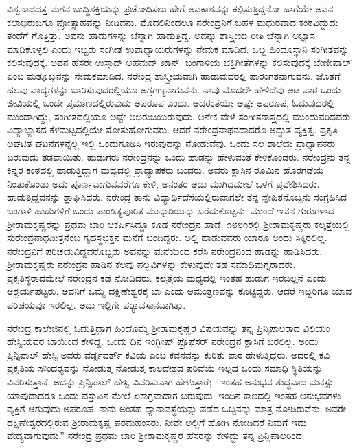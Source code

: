 ವಿಶ್ವನಾಥದತ್ತ ಮಗನ ಬುದ್ಧಿಶಕ್ತಿಯನ್ನು ಪ್ರಚೋದಿಸಲು ಹೇಗೆ ಅವಕಾಶವನ್ನು ಕಲ್ಪಿಸುತ್ತಿದ್ದನೋ ಹಾಗೆಯೇ ಅವನ ಕಲಾಭಿರುಚಿಗೂ ಪ್ರೋತ್ಸಾಹವನ್ನು ನೀಡಿದನು. ಮೊದಲಿನಿಂದಲೂ ನರೇಂದ್ರನಿಗೆ ಬಹಳ ಮಧುರವಾದ ಕಂಠವಿದ್ದುದು ತಂದೆಗೆ ಗೊತ್ತಿತ್ತು. ಅವನು ಹಾಡುಗಳನ್ನು ಚೆನ್ನಾಗಿ ಹಾಡುತ್ತಿದ್ದ. ಅದನ್ನು ಶಾಸ್ತ್ರೀಯ ರೀತಿ ಚೆನ್ನಾಗಿ ಅಭ್ಯಾಸ ಮಾಡಿಕೊಳ್ಳಲಿ ಎಂದು ಇಬ್ಬರು ಸಂಗೀತ ಉಪಾಧ್ಯಾಯರುಗಳನ್ನು ನೇಮಕ ಮಾಡಿದ. ಒಬ್ಬ ಹಿಂದೂಸ್ಥಾನಿ ಸಂಗೀತವನ್ನು ಕಲಿಸುವುದಕ್ಕೆ. ಅವನ ಹೆಸರೇ ಉಸ್ತಾದ್ ಅಹಮದ್ ಖಾನ್. ಬಂಗಾಳಿಯ ಭಕ್ತಿಗೀತೆಗಳನ್ನು ಕಲಿಸುವುದಕ್ಕೆ ಬೇಣೀಪಾಲ್ ಎಂಬ ಮತ್ತೊಬ್ಬನನ್ನು ನೇಮಕಮಾಡಿದ. ನರೇಂದ್ರ ಶಾಸ್ತ್ರೀಯವಾಗಿ ಹಾಡುವುದರಲ್ಲಿ ಪಾರಂಗತನಾಗುವನು. ಜೊತೆಗೆ ಹಲವು ವಾದ್ಯಗಳನ್ನು ಬಾರಿಸುವುದರಲ್ಲಿಯೂ ಅಗ್ರಗಣ್ಯನಾಗುವನು. ನಾವು ಮೊದಲೇ ಹೇಳಿದೆವು ಆಟ ಪಾಠ ಒಂದು ಜೀವಿಯಲ್ಲಿ ಒಂದೇ ಪ್ರಮಾಣದಲ್ಲಿರುವುದು ಅಪರೂಪ ಎಂದು. ಅದರಂತೆಯೇ ಅಷ್ಟೇ ಅಪರೂಪ, ಓದುವುದರಲ್ಲಿ ಮುಂದಾಗಿದ್ದು, ಸಂಗೀತದಲ್ಲಿಯೂ ಅಷ್ಟೇ ಅಭಿರುಚಿಯಿರುವುದು. ಅನೇಕ ವೇಳೆ ಸಂಗೀತಶಾಸ್ತ್ರದಲ್ಲಿ ಮುಂದುವರಿದವರು ವಿದ್ಯಾಭ್ಯಾಸದ ಕೆಳಮಟ್ಟದಲ್ಲಿಯೇ ಸೋತುಹೋಗುವರು. ಆದರೆ ನರೇಂದ್ರನಾಥನದಾದರೊ ಅದ್ಭುತ ವ್ಯಕ್ತಿತ್ವ. ಪ್ರಕೃತಿ ಅಘಟಿತ ಘಟನೆಗಳನ್ನೆಲ್ಲ ಇಲ್ಲಿ ಒಂದುಗೂಡಿಸಿ ಇರುವುದನ್ನು ನೋಡುವೆವು. ಒಂದು ಸಲ ಶಾಲೆಯ ಪ್ರಾಧ್ಯಾಪಕರು ಬರುವುದು ತಡವಾಯಿತು. ಹುಡುಗರು ನರೇಂದ್ರನನ್ನು ಒಂದು ಹಾಡನ್ನು ಹೇಳುವಂತೆ ಕೇಳಿಕೊಂಡರು. ನರೇಂದ್ರನು ತನ್ನ ಕಿನ್ನರ ಕಂಠದಲ್ಲಿ ಹಾಡುತ್ತಿದ್ದಾಗ ಮಧ್ಯದಲ್ಲಿ ಪ್ರಾಧ್ಯಾಪಕರು ಬಂದರು. ಅವರು ಕ್ಲಾಸಿನ ರೂಮಿನ ಹೊರಗಡೆಯೆ ನಿಂತುಕೊಂಡು ಅದು ಪೂರ್ಣವಾಗುವವರೆಗೂ ಕೇಳಿ, ಅನಂತರ ಅದು ಮುಗಿದಮೇಲೆ ಒಳಗೆ ಪ್ರವೇಶಿಸಿದರು. ಹಾಡುತ್ತಿದ್ದವನನ್ನು ಶ್ಲಾಘಿಸಿದರು. ನರೇಂದ್ರ ತಾನು ವಿದ್ಯಾರ್ಥಿದೆಸೆಯಲ್ಲಿರುವಾಗಲೇ ತನ್ನ ಸ್ನೇಹಿತನೊಬ್ಬನು ಸಂಗ್ರಹಿಸಿದ ಬಂಗಾಳಿ ಹಾಡುಗಳಿಗೆ ಒಂದು ಪಾಂಡಿತ್ಯಪೂರಿತ ಮುನ್ನುಡಿಯನ್ನು ಬರೆದುಕೊಟ್ಟನು. ಮುಂದೆ ಇವನ ಗುರುಗಳಾದ ಶ‍್ರೀರಾಮಕೃಷ್ಣರನ್ನು ಪ್ರಥಮ ಬಾರಿ ಆಕರ್ಷಿಸಿದ್ದೂ ಕೂಡ ನರೇಂದ್ರನ ಹಾಡೆ. ೧೮೮೧ರಲ್ಲಿ ಶ‍್ರೀರಾಮಕೃಷ್ಣರು ಕಲ್ಕತ್ತೆಯಲ್ಲಿ ಸುರೇಂದ್ರನಾಥಮಿತ್ರನೆಂಬ ಗೃಹಸ್ಥಭಕ್ತನ ಮನೆಗೆ ಬಂದಿದ್ದರು. ಅಲ್ಲಿ ಹಾಡುವವರು ಯಾರೂ ಅಂದು ಸಿಕ್ಕಿರಲಿಲ್ಲ. ನರೇಂದ್ರನಿಗೆ ಪರಿಚಯವಿದ್ದವರೊಬ್ಬರು ಅವನನ್ನು ಮನೆಯಿಂದ ಕರೆಸಿ ನರೇಂದ್ರನಿಂದ ಹಾಡನ್ನು ಹಾಡಿಸಿದರು. ಶ‍್ರೀರಾಮಕೃಷ್ಣರು ನರೇಂದ್ರನ ಹಾಡಿನ ಕೆಲವು ಪಲ್ಲವಿಗಳನ್ನು ಕೇಳುವುದೇ ತಡ ಸಮಾಧಿಮಗ್ನರಾದರು. ಪ್ರಕೃತಿಸ್ಥರಾದಮೇಲೆ ನರೇಂದ್ರನ ಕಡೆ ನೋಡಿದರು. ಕಲ್ಕತ್ತೆಯ ಮಧ್ಯದಲ್ಲಿ ಇಂತಹ ಹುಡುಗ ಇರಬಲ್ಲನೆ ಎಂದು ಆಶ್ಚರ್ಯಪಟ್ಟರು. ಅವನಿಗೆ ಒಮ್ಮೆ ದಕ್ಷಿಣೇಶ್ವರಕ್ಕೆ ಬಾ ಎಂದು ಆಮಂತ್ರಣವನ್ನು ಕೊಟ್ಟಿದ್ದರು. ಆದರೆ ಇಬ್ಬರಿಗೂ ಯಾವ ಪರಿಚಯವೂ ಇರಲಿಲ್ಲ. ಅದು ಇಲ್ಲಿಗೇ ಪರ‍್ಯಾವಸಾನವಾಗಿತ್ತು.

ನರೇಂದ್ರ ಕಾಲೇಜಿನಲ್ಲಿ ಓದುತ್ತಿದ್ದಾಗ ಹಿಂದೊಮ್ಮೆ ಶ‍್ರೀರಾಮಕೃಷ್ಣರ ವಿಷಯವನ್ನು ತನ್ನ ಪ್ರಿನ್ಸಿಪಾಲರಾದ ವಿಲಿಯಂ ಹೇಸ್ಟಿಯವರ ಬಾಯಿಂದ ಕೇಳಿದ್ದ. ಒಂದು ದಿನ ಇಂಗ್ಲೀಷ್ ಪ್ರೊಫೆಸರ್ ನರೇಂದ್ರನ ಕ್ಲಾಸಿಗೆ ಬರಲಿಲ್ಲ. ಅಂದು ಪ್ರಿನ್ಸಿಪಾಲ್ ಹೇಸ್ಟಿ ಅವರು ವರ್ಡ್ಸವರ್ತ್ ಕವಿಯ  ಎಂಬ ಕವನವನ್ನು ಕುರಿತು ಪಾಠ ಹೇಳುತ್ತಿದ್ದರು. ಅದರಲ್ಲಿ ಕವಿ ಪ್ರಕೃತಿಯ ಸೌಂದರ‍್ಯವನ್ನು ನೋಡುತ್ತ ನೋಡುತ್ತ ಕಾಲದೇಶದ ಪರಿವೆಯೆ ಇಲ್ಲದ ಒಂದು ಸಮಾಧಿ ಸ್ಥಿತಿಯನ್ನು ವಿವರಿಸುತ್ತಾನೆ. ಅದನ್ನು ಪ್ರಿನ್ಸಿಪಾಲ್ ಹೇಸ್ಟಿ ವಿವರಿಸುವಾಗ ಹೇಳುತ್ತಾರೆ; “ಇಂತಹ ಅನುಭವ ಶುದ್ಧವಾದ ಮನಸ್ಸು ಯಾವುದಾದರೂ ಒಂದು ವಸ್ತುವಿನ ಮೇಲೆ ಏಕಾಗ್ರವಾದಾಗ ಬರುವುದು. ಇಂದಿನ ಕಾಲದಲ್ಲಿ ಇಂತಹ ಅನುಭವಗಳು ವ್ಯಕ್ತಿಗೆ ಆಗುವುದು ಅಪರೂಪ. ನಾನು ಅಂತಹ ಧ್ಯಾನಾವಸ್ಥೆಯನ್ನು ಪಡೆದ ಒಬ್ಬನನ್ನು ಮಾತ್ರ ನೋಡಿರುವೆನು. ಅವರೇ ದಕ್ಷಿಣೇಶ್ವರದಲ್ಲಿರುವ ಶ‍್ರೀರಾಮಕೃಷ್ಣ ಪರಮಹಂಸರು. ನೀವೇ ಅಲ್ಲಿಗೆ ಹೋಗಿ ನೋಡಿದರೆ ನಿಮಗೆ ಇದು ವೇದ್ಯವಾಗುವುದು.” ನರೇಂದ್ರ ಪ್ರಥಮ ಬಾರಿ ಶ‍್ರೀರಾಮಕೃಷ್ಣರ ಹೆಸರನ್ನು ಕೇಳಿದ್ದು ತನ್ನ ಪ್ರಿನ್ಸಿಪಾಲರಿಂದ.

